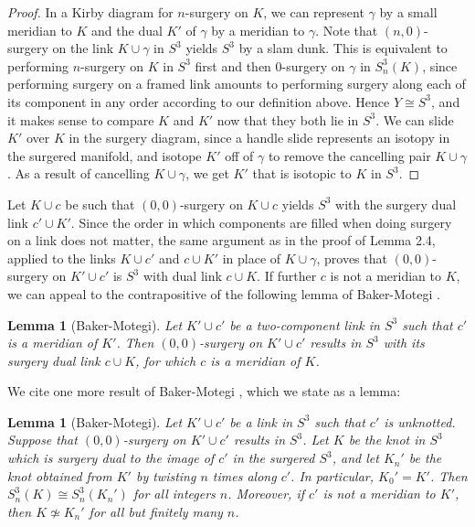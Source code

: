 \documentclass[11pt,usenames,dvipsnames,reqno]{amsart}
\numberwithin{theorem}{section}
\newtheorem{lemma}[theorem]{Lemma}
\theoremstyle{ex}
\theoremstyle{rem}
\begin{document}
\begin{proof}
	In a Kirby diagram for $n$-surgery on $K$, we can represent $\gamma$ by a small meridian to $K$ and the dual $K'$ of $\gamma$ by a meridian to $\gamma$. Note that $(n, 0)$-surgery on the link $K \cup \gamma$ in $S^3$ yields $S^3$ by a slam dunk. This is equivalent to performing $n$-surgery on $K$ in $S^3$ first and then $0$-surgery on $\gamma$ in $S^3_n(K)$, since performing surgery on a framed link amounts to performing surgery along each of its component in any order according to our definition above. Hence $Y \cong S^3$, and it makes sense to compare $K$ and $K'$ now that they both lie in $S^3$. We can slide $K'$ over $K$ in the surgery diagram, since a handle slide represents an isotopy in the surgered manifold, and isotope $K'$ off of $\gamma$ to remove the cancelling pair $K\cup \gamma$. As a result of cancelling $K\cup \gamma$, we get $K'$ that is isotopic to $K$ in $S^3$. 
\end{proof}

Let $K \cup c$ be such that $(0, 0)$-surgery on $K \cup c$ yields $S^3$ with the surgery dual link $c' \cup K'$. Since the order in which components are filled when doing surgery on a link does not matter, the same argument as in the proof of Lemma 2.4, applied to the links $K\cup c'$ and $c\cup K'$ in place of $K\cup \gamma$, proves that $(0,0)$-surgery on $K'\cup c'$ is $S^3$ with dual link $c\cup K$. If further $c$ is not a meridian to $K$, we can appeal to the contrapositive of the following lemma of Baker-Motegi \cite[Lemma 2.4]{baker-motegi}. 

\begin{lemma}[Baker-Motegi]
	Let $K'\cup c'$ be a two-component link in $S^3$ such that $c'$ is a meridian of $K'$. Then $(0,0)$-surgery on $K'\cup c'$ results in $S^3$ with its surgery dual link $c\cup K$, for which $c$ is a meridian of $K$.
\end{lemma}
	
We cite one more result of Baker-Motegi \cite[Theorem 2.1]{baker-motegi}, which we state as a lemma:

\begin{lemma}[Baker-Motegi]
	Let $K'\cup c'$ be a link in $S^3$ such that $c'$ is unknotted. Suppose that $(0,0)$-surgery on $K'\cup c'$ results in $S^3$. Let $K$ be the knot in $S^3$ which is surgery dual to the image of $c'$ in the surgered $S^3$, and let $K_n'$ be the knot obtained from $K'$ by twisting $n$ times along $c'$. In particular, $K_0'=K'$. Then $S^3_n(K)\cong S^3_n(K_n')$ for all integers $n$. Moreover, if $c'$ is not a meridian to $K'$, then $K\not\simeq K_n'$ for all but finitely many $n$.
\end{lemma}
\end{document}
